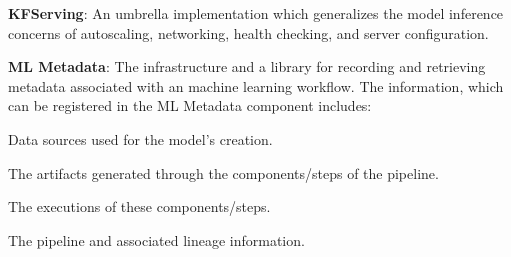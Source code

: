 \eit
\item \textbf{KFServing}: An umbrella implementation which generalizes the model inference concerns of autoscaling,
networking, health checking, and server configuration.
\item \textbf{ML Metadata}: The infrastructure and a library for recording and retrieving metadata associated with an
machine learning workflow. The information, which can be registered in the ML Metadata component includes:
\bit
\item Data sources used for the model’s creation.
\item The artifacts generated through the components/steps of the pipeline.
\item The executions of these components/steps.
\item The pipeline and associated lineage information.
\eit
\eit

